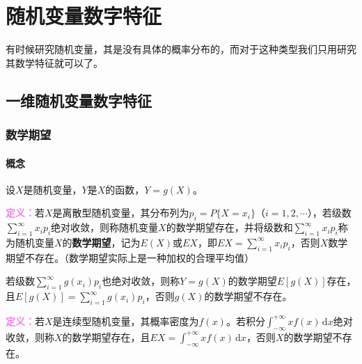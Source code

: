 \setcounter{tocdepth}{4}
\setcounter{secnumdepth}{4}
\renewcommand{\baselinestretch}{1.5}
\usepackage{diagbox}
\chapter{随机变量数字特征}

有时候研究随机变量，其是没有具体的概率分布的，而对于这种类型我们只用研究其数学特征就可以了。

\section{一维随机变量数字特征}

\subsection{数学期望}

\subsubsection{概念}

设$X$是随机变量，$Y$是$X$的函数，$Y=g(X)$。

\textcolor{violet}{\textbf{定义：}}若$X$是离散型随机变量，其分布列为$p_i=P\{X=x_i\}$（$i=1,2,\cdots$），若级数$\sum\limits_{i=1}^\infty x_ip_i$绝对收敛，则称随机变量$X$的数学期望存在，并将级数和$\sum\limits_{i=1}^\infty x_ip_i$称为随机变量$X$的\textbf{数学期望}，记为$E(X)$或$EX$，即$EX=\sum\limits_{i=1}^\infty x_ip_i$，否则$X$数学期望不存在。（数学期望实际上是一种加权的合理平均值）

若级数$\sum\limits_{i=1}^\infty g(x_i)p_i$也绝对收敛，则称$Y=g(X)$的数学期望$E[g(X)]$存在，且$E[g(X)]=\sum\limits_{i=1}^\infty g(x_i)p_i$，否则$g(X)$的数学期望不存在。

\textcolor{violet}{\textbf{定义：}}若$X$是连续型随机变量，其概率密度为$f(x)$。若积分$\int_{-\infty}^{+\infty}xf(x)\,\textrm{d}x$绝对收敛，则称$X$的数学期望存在，且$EX=\int_{-\infty}^{+\infty}xf(x)\,\textrm{d}x$，否则$X$的数学期望不存在。

